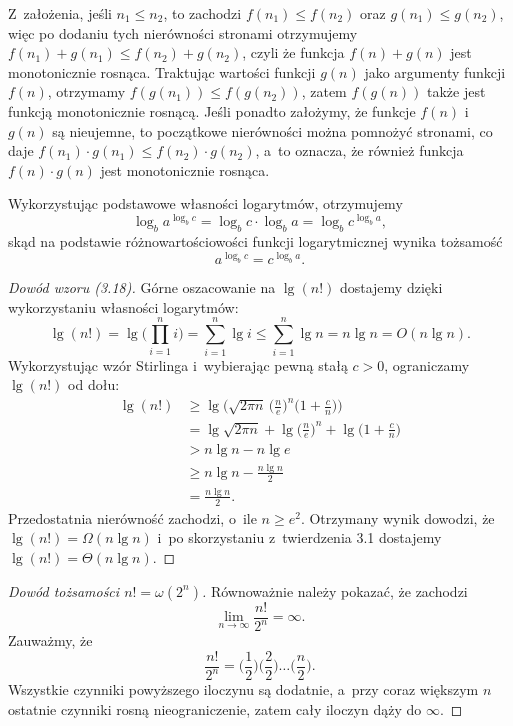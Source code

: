
\exercise %
Z~założenia, jeśli $n_1\le n_2$, to zachodzi $f(n_1)\le f(n_2)$ oraz $g(n_1)\le g(n_2)$, więc po dodaniu tych nierówności stronami otrzymujemy $f(n_1)+g(n_1)\le f(n_2)+g(n_2)$, czyli że funkcja $f(n)+g(n)$ jest monotonicznie rosnąca.
Traktując wartości funkcji $g(n)$ jako argumenty funkcji $f(n)$, otrzymamy $f(g(n_1))\le f(g(n_2))$, zatem $f(g(n))$ także jest funkcją monotonicznie rosnącą.
Jeśli ponadto założymy, że funkcje $f(n)$ i~$g(n)$ są nieujemne, to początkowe nierówności można pomnożyć stronami, co daje $f(n_1)\cdot g(n_1)\le f(n_2)\cdot g(n_2)$, a~to oznacza, że również funkcja $f(n)\cdot g(n)$ jest monotonicznie rosnąca.

\exercise %
Wykorzystując podstawowe własności logarytmów, otrzymujemy
\[
	\log_ba^{\log_bc} = \log_bc\cdot\log_ba = \log_bc^{\log_ba},
\]
skąd na podstawie różnowartościowości funkcji logarytmicznej wynika tożsamość
\[
	a^{\log_bc} = c^{\log_ba}.
\]

\exercise %
\begin{proof}[Dowód wzoru (3.18)]
	Górne oszacowanie na $\lg(n!)$ dostajemy dzięki wykorzystaniu własności logarytmów:
	\[
	    \lg(n!) = \lg\biggl(\prod_{i=1}^ni\biggr) = \sum_{i=1}^n\lg i \le \sum_{i=1}^n\lg n = n\lg n = O(n\lg n).
	\]
	Wykorzystując wzór Stirlinga i~wybierając pewną stałą $c>0$, ograniczamy $\lg(n!)$ od dołu:
	\begin{align*}
		\lg(n!) &\ge \lg\biggl(\!\sqrt{2\pi n}\,\biggl(\frac{n}{e}\biggr)^n\biggl(1+\frac{c}{n}\biggr)\biggr) \\
		&= \lg\sqrt{2\pi n}+\lg\biggl(\frac{n}{e}\biggr)^n+\lg\biggl(1+\frac{c}{n}\biggr) \\
		&> n\lg n-n\lg e \\
		&\ge n\lg n-\frac{n\lg n}{2} \\
		&= \frac{n\lg n}{2}.
	\end{align*}
	Przedostatnia nierówność zachodzi, o~ile $n\ge e^2$.
Otrzymany wynik dowodzi, że $\lg(n!)=\Omega(n\lg n)$ i~po skorzystaniu z~twierdzenia 3.1 dostajemy $\lg(n!)=\Theta(n\lg n)$.
\end{proof}

\begin{proof}[Dowód tożsamości $n!=\omega(2^n)$]
	Równoważnie należy pokazać, że zachodzi
	\[
		\lim_{n\to\infty}\frac{n!}{2^n} = \infty.
	\]
	Zauważmy, że
	\[
	    \frac{n!}{2^n} = \biggl(\frac{1}{2}\biggr)\biggl(\frac{2}{2}\biggr)\dots\biggl(\frac{n}{2}\biggr).
	\]
	Wszystkie czynniki powyższego iloczynu są dodatnie, a~przy coraz większym $n$ ostatnie czynniki rosną nieograniczenie, zatem cały iloczyn dąży do $\infty$.
\end{proof}

